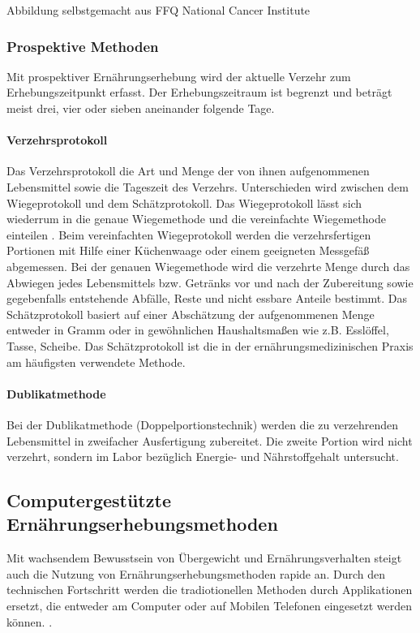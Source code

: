 Abbildung selbstgemacht aus FFQ National Cancer Institute

\subsubsection{Prospektive Methoden}

Mit  prospektiver Ernährungserhebung wird der aktuelle Verzehr zum Erhebungszeitpunkt erfasst. Der Erhebungszeitraum ist begrenzt und beträgt meist drei, vier oder sieben aneinander folgende Tage. 

\paragraph{Verzehrsprotokoll}

Das Verzehrsprotokoll die Art und Menge der von ihnen aufgenommenen Lebensmittel sowie die Tageszeit des Verzehrs. Unterschieden wird zwischen dem Wiegeprotokoll und dem Schätzprotokoll. 
Das Wiegeprotokoll lässt sich wiederrum in die genaue Wiegemethode und die vereinfachte Wiegemethode einteilen \cite{sichert1984ernaehrungs}. Beim vereinfachten Wiegeprotokoll werden die verzehrsfertigen Portionen mit Hilfe einer Küchenwaage oder einem geeigneten Messgefäß abgemessen. Bei der genauen Wiegemethode wird die verzehrte Menge durch das Abwiegen jedes Lebensmittels bzw. Getränks vor und nach der Zubereitung sowie gegebenfalls entstehende Abfälle, Reste und nicht essbare Anteile bestimmt. \cite{PHN:587344} Das Schätzprotokoll basiert auf einer Abschätzung der aufgenommenen Menge entweder in Gramm oder in gewöhnlichen Haushaltsmaßen wie z.B. Esslöffel, Tasse, Scheibe.
Das Schätzprotokoll ist die in der ernährungsmedizinischen Praxis am häufigsten verwendete Methode. \cite{muller2007ernahrungsmedizinische}


\paragraph{Dublikatmethode}

Bei der Dublikatmethode (Doppelportionstechnik) werden die zu verzehrenden Lebensmittel in zweifacher Ausfertigung zubereitet. Die zweite Portion wird nicht verzehrt, sondern im Labor bezüglich Energie- und Nährstoffgehalt untersucht. 
\subsection{Computergestützte Ernährungserhebungsmethoden}

Mit wachsendem Bewusstsein von Übergewicht und Ernährungsverhalten steigt auch die Nutzung von Ernährungserhebungsmethoden rapide an. Durch den technischen Fortschritt werden die tradiotionellen Methoden durch Applikationen ersetzt, die entweder am Computer oder auf Mobilen Telefonen eingesetzt werden können. \cite{Morikawa:2012:FRS:2390776.2390779}. 


